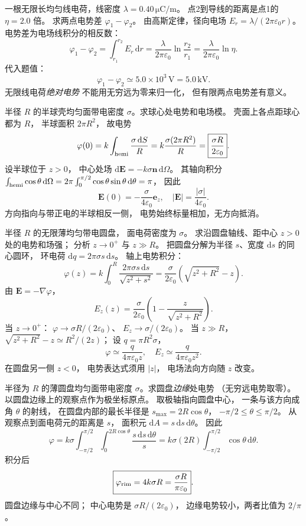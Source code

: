 一根无限长均匀线电荷，线密度
$\lambda=0.40\,\mathrm{\mu C/m}$。
点2到导线的距离是点1的 $\eta=2.0$ 倍。
求两点电势差 $\varphi_1-\varphi_2$。
\exsolution
由高斯定律，径向电场
$E_r=\lambda/(2\pi\varepsilon_0r)$。
电势差为电场线积分的相反数：
\[
\varphi_1-\varphi_2=
\int_{r_1}^{r_2}E_r\,\mathrm dr
=\frac{\lambda}{2\pi\varepsilon_0}
\ln\frac{r_2}{r_1}
=\frac{\lambda}{2\pi\varepsilon_0}\ln\eta.
\]
代入题值：
\[
\boxed{\varphi_1-\varphi_2\simeq
5.0\times10^3\,\mathrm V=5.0\,\mathrm{kV}}.
\]
\excheck 无限线电荷\emph{绝对电势}
不能用无穷远为零来归一化，
但有限两点电势差有意义。

半径 $R$ 的半球壳均匀面带电密度
$\sigma$。求球心处电势和电场模。
\exsolution
壳面上各点距球心都为 $R$，
半球面积 $2\pi R^2$，
故电势
\[
\varphi(0)=k\int_{\rm hemi}\frac{\sigma\,\mathrm dS}R
=k\frac{\sigma(2\pi R^2)}R
=\boxed{\frac{\sigma R}{2\varepsilon_0}}.
\]
设半球位于 $z>0$，
中心处场
$\mathrm d\bm E=-k\sigma\bm n\,\mathrm d\Omega$。
其轴向积分
$\int_{\rm hemi}\cos\theta\,\mathrm d\Omega
=2\pi\int_0^{\pi/2}\cos\theta\sin\theta\,\mathrm d\theta=\pi$，
因此
\[
\boxed{\bm E(0)=-\frac{\sigma}{4\varepsilon_0}\bm e_z},
\quad
\boxed{|\bm E|=\frac{|\sigma|}{4\varepsilon_0}}.
\]
\excheck 方向指向与带正电的半球相反一侧，
电势始终标量相加，无方向抵消。

半径 $R$ 的无限薄均匀带电圆盘，
面电荷密度为 $\sigma$。
求沿圆盘轴线、距中心 $z>0$ 处的电势和场强；
分析 $z\to0^+$ 与 $z\gg R$。
\exsolution
把圆盘分解为半径 $s$、宽度 $\mathrm ds$
的同心圆环，
环电荷
$\mathrm dq=2\pi\sigma s\,\mathrm ds$。
轴上电势积分：
\[
\varphi(z)=k\int_0^R
\frac{2\pi\sigma s\,\mathrm ds}{\sqrt{z^2+s^2}}
=\boxed{\frac{\sigma}{2\varepsilon_0}
(\sqrt{z^2+R^2}-z)}.
\]
由 $\bm E=-\nabla\varphi$，
\[
\boxed{E_z(z)=\frac{\sigma}{2\varepsilon_0}
\left(1-\frac{z}{\sqrt{z^2+R^2}}\right)}.
\]
当 $z\to0^+$：
$\varphi\to\sigma R/(2\varepsilon_0)$、
$E_z\to\sigma/(2\varepsilon_0)$。
当 $z\gg R$，
$\sqrt{z^2+R^2}-z\simeq R^2/(2z)$；
设 $q=\pi R^2\sigma$，
\[
\boxed{\varphi\simeq\frac{q}{4\pi\varepsilon_0z},
\quad E_z\simeq\frac{q}{4\pi\varepsilon_0z^2}}.
\]
\excheck 在圆盘另一侧 $z<0$，
电势表达式须用 $|z|$，
电场法向方向随 $z$ 改变。

半径为 $R$ 的薄圆盘均匀面带电密度
$\sigma$。求圆盘\emph{边缘}处电势
（无穷远电势取零）。
\exsolution
以圆盘边缘上的观察点作为极坐标原点。
取极轴指向圆盘中心，
一条与该方向成角 $\theta$ 的射线，
在圆盘内部的最长半径是
$s_{\max}=2R\cos\theta$，
$-\pi/2\le\theta\le\pi/2$。
从观察点到面电荷元的距离是 $s$，
面积元
$\mathrm dA=s\,\mathrm ds\,\mathrm d\theta$。
因此
\[
\varphi=k\sigma
\int_{-\pi/2}^{\pi/2}
\int_0^{2R\cos\theta}
\frac{s\,\mathrm ds\,\mathrm d\theta}{s}
=k\sigma(2R)\int_{-\pi/2}^{\pi/2}
\cos\theta\,\mathrm d\theta.
\]
积分后
\[
\boxed{\varphi_{\rm rim}=
4k\sigma R=\frac{\sigma R}{\pi\varepsilon_0}}.
\]
\excheck 圆盘边缘与中心不同；
中心电势是 $\sigma R/(2\varepsilon_0)$，
边缘电势较小，两者比值为 $2/\pi$。

